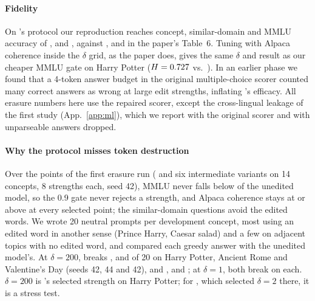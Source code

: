 \paragraph{Fidelity}
On \ember{}'s protocol our reproduction reaches concept, similar-domain and MMLU accuracy of ,  and , against ,  and  in the paper's Table~6.
Tuning with Alpaca coherence inside the $\delta$ grid, as the paper does, gives the same $\delta$ and result as our cheaper MMLU gate on Harry Potter ($H = 0.727$ vs.\ ).
In an earlier phase we found that a 4-token answer budget in the original multiple-choice scorer counted many correct answers as wrong at large edit strengths, inflating \ember{}'s efficacy. All erasure numbers here use the repaired scorer, except the cross-lingual leakage of the first study (App.~\ref{app:ml}), which we report with the original scorer and with unparseable answers dropped.

\paragraph{Why the protocol misses token destruction}
Over the  points of the first erasure run (\ember{} and six intermediate variants on 14 concepts, 8 strengths each, seed 42), MMLU never falls below  of the unedited model, so the 0.9 gate never rejects a strength, and Alpaca coherence stays at or above  at every selected point; the similar-domain questions avoid the edited words.
We wrote 20 neutral prompts per development concept, most using an edited word in another sense (Prince Harry, Caesar salad) and a few on adjacent topics with no edited word, and compared each greedy answer with the unedited model's.
At $\delta = 200$, \ember{} breaks ,  and  of 20 on Harry Potter, Ancient Rome and Valentine's Day (seeds 42, 44 and 42), and \cinder{} ,  and ; at $\delta = 1$, both break  on each.
$\delta = 200$ is \ember{}'s selected strength on Harry Potter; for \cinder{}, which selected $\delta = 2$ there, it is a stress test.
